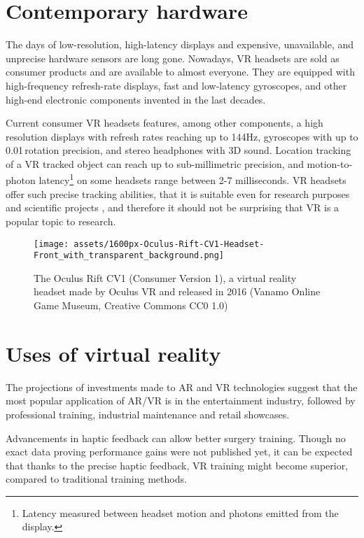 \section{Contemporary hardware}
The days of low-resolution, high-latency displays and expensive, unavailable,
and unprecise hardware sensors are long gone. Nowadays, VR headsets are
sold as consumer products and are available to almost everyone. They are
equipped with high-frequency refresh-rate displays, fast and low-latency
gyroscopes, and other high-end electronic components invented in the last
decades.

Current consumer VR headsets features, among other components,
a high resolution displays with refresh rates reaching up to 144Hz,
\cite{vlvindx} gyroscopes with up to 0.01\degree\,rotation precision, 
and stereo headphones with 3D sound. \cite{vivenasa}
Location tracking of a VR tracked object can reach up to sub-millimetric precision, 
and motion-to-photon latency\footnote{Latency measured between headset motion and photons emitted from the display.}
on some headsets range between 2-7 milliseconds. \cite{mtpltc} \cite{xinwiki}
VR headsets offer such precise tracking abilities, that it is suitable even
for research purposes and scientific projects \cite{vivepbsr}, and therefore
it should not be surprising that VR is a popular topic to research.


\begin{figure}[h]{}
\centering\texttt{[image: assets/1600px-Oculus-Rift-CV1-Headset-Front\_with\_transparent\_background.png]}
\caption{The Oculus Rift CV1 (Consumer Version 1), a virtual reality headset made by Oculus VR and released in 2016 
    (Vanamo Online Game Museum, Creative Commons CC0 1.0)}
\end{figure}

\section{Uses of virtual reality}
The projections of investments made to AR and VR technologies suggest
that the most popular application of AR/VR is in the entertainment industry,
followed by professional training, industrial maintenance and retail showcases.
\cite{statistavr}


Advancements in haptic feedback can allow better surgery training\cite{vhfcrmisvrt}. 
Though no exact data proving performance gains
were not published yet, it can be expected that thanks to the precise haptic
feedback, VR training might become superior, compared to traditional
training methods. \cite{vrsrgr}


